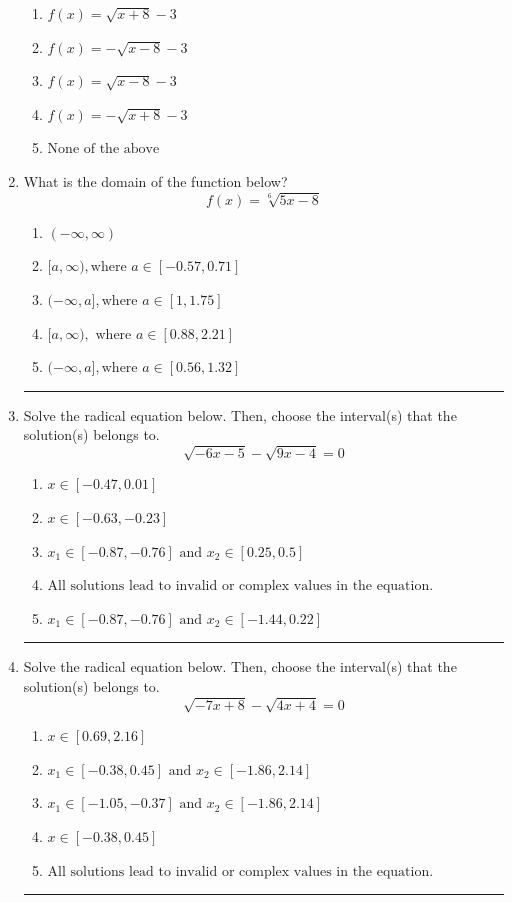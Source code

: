 \documentclass[14pt]{extbook}
\newcommand{\litem}[1]{\item#1\hspace*{-1cm}\rule{\textwidth}{0.4pt}}
\begin{document}
\begin{enumerate}
{\begin{center}
\end{center}
\begin{enumerate}[label=\Alph*.]
\item \( f(x) = \sqrt{x + 8} - 3 \)
\item \( f(x) = - \sqrt{x - 8} - 3 \)
\item \( f(x) = \sqrt{x - 8} - 3 \)
\item \( f(x) = - \sqrt{x + 8} - 3 \)
\item \( \text{None of the above} \)

\end{enumerate} }
\litem{
What is the domain of the function below?\[ f(x) = \sqrt[6]{5 x - 8} \]\begin{enumerate}[label=\Alph*.]
\item \( (-\infty, \infty) \)
\item \( [a, \infty), \text{where } a \in [-0.57, 0.71] \)
\item \( (-\infty, a], \text{where } a \in [1, 1.75] \)
\item \( [a, \infty), \text{ where } a \in [0.88, 2.21] \)
\item \( (-\infty, a], \text{where } a \in [0.56, 1.32] \)

\end{enumerate} }
\litem{
Solve the radical equation below. Then, choose the interval(s) that the solution(s) belongs to.\[ \sqrt{-6 x - 5} - \sqrt{9 x - 4} = 0 \]\begin{enumerate}[label=\Alph*.]
\item \( x \in [-0.47,0.01] \)
\item \( x \in [-0.63,-0.23] \)
\item \( x_1 \in [-0.87, -0.76] \text{ and } x_2 \in [0.25,0.5] \)
\item \( \text{All solutions lead to invalid or complex values in the equation.} \)
\item \( x_1 \in [-0.87, -0.76] \text{ and } x_2 \in [-1.44,0.22] \)

\end{enumerate} }
\litem{
Solve the radical equation below. Then, choose the interval(s) that the solution(s) belongs to.\[ \sqrt{-7 x + 8} - \sqrt{4 x + 4} = 0 \]\begin{enumerate}[label=\Alph*.]
\item \( x \in [0.69,2.16] \)
\item \( x_1 \in [-0.38, 0.45] \text{ and } x_2 \in [-1.86,2.14] \)
\item \( x_1 \in [-1.05, -0.37] \text{ and } x_2 \in [-1.86,2.14] \)
\item \( x \in [-0.38,0.45] \)
\item \( \text{All solutions lead to invalid or complex values in the equation.} \)


\end{enumerate}}
\end{enumerate}
\end{document}
